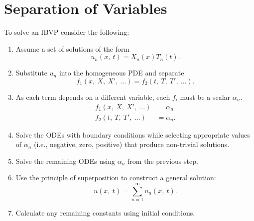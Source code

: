 \documentclass{article}
\begin{document}
\section{Separation of Variables}
To solve an IBVP consider the following:
\begin{enumerate}
    \item Assume a set of solutions of the form
          \begin{equation*}
              u_n\left( x,\: t \right) = X_n\left( x \right) T_n\left( t \right).
          \end{equation*}
    \item Substitute \(u_n\) into the homogeneous PDE and separate
          \begin{equation*}
              f_1\left( x,\: X,\: X',\: \dots \right) = f_2\left( t,\: T,\: T',\: \dots \right).
          \end{equation*}
    \item As each term depends on a different variable, each \(f_i\)
          must be a scalar \(\alpha_n\).
          \begin{align*}
              f_1\left( x,\: X,\: X',\: \dots \right) & = \alpha_n  \\
              f_2\left( t,\: T,\: T',\: \dots \right) & = \alpha_n.
          \end{align*}
    \item Solve the ODEs with boundary conditions while selecting
          appropriate values of \(\alpha_n\) (i.e., negative, zero,
          positive) that produce non-trivial solutions.
    \item Solve the remaining ODEs using \(\alpha_n\) from the previous
          step.
    \item Use the principle of superposition to construct a general
          solution:
          \begin{equation*}
              u\left( x,\: t \right) = \sum_{n = 1}^\infty u_n\left( x,\: t \right).
          \end{equation*}
    \item Calculate any remaining constants using initial conditions.
\end{enumerate}
\end{document}

